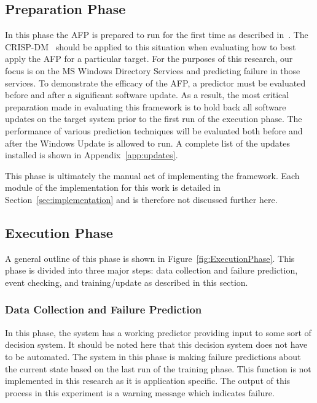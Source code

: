 \subsection{Preparation Phase}
In this phase the \ac{AFP} is prepared to run for the first time as described
in~\cite{irrera2015}.  The \ac{CRISP-DM}~\cite{crispdm} should be applied to
this situation when evaluating how to best apply the \ac{AFP} for a particular
target.  For the purposes of this research, our focus is on the \ac{MS}
Windows Directory Services and predicting failure in those services.  To
demonstrate the efficacy of the \ac{AFP}, a predictor must be evaluated before
and after a significant software update.  As a result, the most critical
preparation made in evaluating this framework is to hold back all software
updates on the target system prior to the first run of the execution phase.
The performance of various prediction techniques will be evaluated both before
and after the Windows Update is allowed to run.  A complete list of the updates
installed is shown in Appendix~\ref{app:updates}.

This phase is ultimately the manual act of implementing the framework.  Each
module of the implementation for this work is detailed in
Section~\ref{sec:implementation} and is therefore not discussed further here.  

\subsection{Execution Phase}
A general outline of this phase is shown in Figure~\ref{fig:ExecutionPhase}.
This phase is divided into three major steps: data collection and failure
prediction, event checking, and training/update as described in this section.

\figExecutionPhase{2.5in}

\subsubsection{Data Collection and Failure Prediction}
In this phase, the system has a working predictor providing input to some sort
of decision system.  It should be noted here that this decision system does not
have to be automated.  The system in this phase is making failure predictions
about the current state based on the last run of the training phase.  This
function is not implemented in this research as it is application specific.
The output of this process in this experiment is a warning message which
indicates failure.

